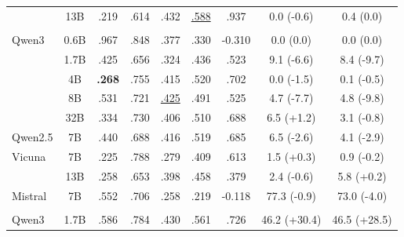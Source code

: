 \begin{table}[t]
\begin{tabular}{>{\raggedright\arraybackslash}p{2.2cm}cccccccc}
 & 13B & \cellcolor[HTML]{F7EBD9}.219 & .614 & \cellcolor[HTML]{D9EAF3}.432 & \cellcolor[HTML]{D9EAF3}\underline{.588} & \cellcolor[HTML]{F7EBD9}.937 & \cellcolor{gray!20}0.0 \textcolor[HTML]{2166AC}{(-0.6)} & \cellcolor{gray!20}0.4 (0.0) \\
\addlinespace[1pt]
\midrule
\multicolumn{9}{c}{\textit{SA-LLMs}}\\ 
\midrule
Qwen3 & 0.6B & .967 & .848 & .377 & .330 & -0.310 & \cellcolor{gray!20}0.0 (0.0) & \cellcolor{gray!20}0.0 (0.0) \\
 & 1.7B & .425 & .656 & .324 & .436 & .523 & \cellcolor{gray!20}9.1 \textcolor[HTML]{2166AC}{(-6.6)} & \cellcolor{gray!20}8.4 \textcolor[HTML]{2166AC}{(-9.7)} \\
 & 4B & \cellcolor[HTML]{D9EAF3}\textbf{.268} & .755 & \cellcolor[HTML]{D9EAF3}.415 & .520 & .702 & \cellcolor{gray!20}0.0 \textcolor[HTML]{2166AC}{(-1.5)} & \cellcolor{gray!20}0.1 \textcolor[HTML]{2166AC}{(-0.5)} \\
 & 8B & .531 & .721 & \cellcolor[HTML]{D9EAF3}\underline{.425} & .491 & .525 & \cellcolor{gray!20}4.7 \textcolor[HTML]{2166AC}{(-7.7)} & \cellcolor{gray!20}4.8 \textcolor[HTML]{2166AC}{(-9.8)} \\
 & 32B & .334 & .730 & \cellcolor[HTML]{D9EAF3}.406 & .510 & .688 & \cellcolor{gray!20}6.5 \textcolor[HTML]{D6610A}{(+1.2)} & \cellcolor{gray!20}3.1 \textcolor[HTML]{2166AC}{(-0.8)} \\
Qwen2.5 & 7B & .440 & .688 & \cellcolor[HTML]{D9EAF3}.416 & .519 & .685 & \cellcolor{gray!20}6.5 \textcolor[HTML]{2166AC}{(-2.6)} & \cellcolor{gray!20}4.1 \textcolor[HTML]{2166AC}{(-2.9)} \\
Vicuna & 7B & \cellcolor[HTML]{F7EBD9}.225 & .788 & .279 & .409 & .613 & \cellcolor{gray!20}1.5 \textcolor[HTML]{D6610A}{(+0.3)} & \cellcolor{gray!20}0.9 \textcolor[HTML]{2166AC}{(-0.2)} \\
 & 13B & \cellcolor[HTML]{F7EBD9}.258 & .653 & \cellcolor[HTML]{D9EAF3}.398 & .458 & .379 & \cellcolor{gray!20}2.4 \textcolor[HTML]{2166AC}{(-0.6)} & \cellcolor{gray!20}5.8 \textcolor[HTML]{D6610A}{(+0.2)} \\
Mistral & 7B & .552 & .706 & .258 & .219 & -0.118 & 77.3 \textcolor[HTML]{2166AC}{(-0.9)} & 73.0 \textcolor[HTML]{2166AC}{(-4.0)} \\
\midrule
\multicolumn{9}{c}{\textit{Thinking Models}}\\ 
\midrule
Qwen3 & 1.7B & .586 & .784 & \cellcolor[HTML]{D9EAF3}.430 & \cellcolor[HTML]{D9EAF3}.561 & .726 & \cellcolor{gray!10}46.2 \textcolor[HTML]{D6610A}{(+30.4)} & \cellcolor{gray!5}46.5 \textcolor[HTML]{D6610A}{(+28.5)} \\

\end{tabular}
\end{table}
